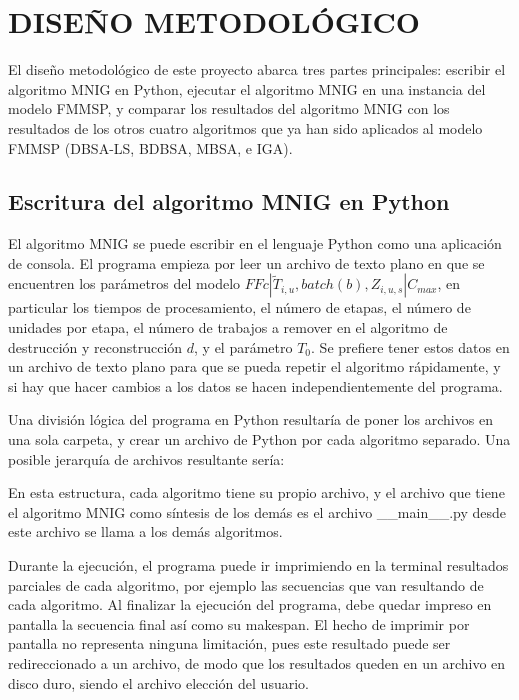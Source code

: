 \documentclass{article}
\def\notac_modelo{$FFc | \tilde{T}_{i, u}, batch(b), Z_{i, u, s} | C_{max}$}
\begin{document}
\section{DISEÑO METODOLÓGICO}

El diseño metodológico de este proyecto abarca tres partes principales: escribir el algoritmo MNIG en Python, ejecutar el algoritmo MNIG en una instancia del modelo FMMSP, y comparar los resultados del algoritmo MNIG con los resultados de los otros cuatro algoritmos que ya han sido aplicados al modelo FMMSP (DBSA-LS, BDBSA, MBSA, e IGA).

\subsection{Escritura del algoritmo MNIG en Python}

El algoritmo MNIG se puede escribir en el lenguaje Python como una aplicación de consola. El programa empieza por leer un archivo de texto plano en que se encuentren los parámetros del modelo \notac_modelo, en particular los tiempos de procesamiento, el número de etapas, el número de unidades por etapa, el número de trabajos a remover en el algoritmo de destrucción y reconstrucción $d$, y el parámetro $T_{0}$. Se prefiere tener estos datos en un archivo de texto plano para que se pueda repetir el algoritmo rápidamente, y si hay que hacer cambios a los datos se hacen independientemente del programa.

\vspace{\baselineskip}
Una división lógica del programa en Python resultaría de poner los archivos en una sola carpeta, y crear un archivo de Python por cada algoritmo separado. Una posible jerarquía de archivos resultante sería:

\vspace{\baselineskip}

\vspace{\baselineskip}
En esta estructura, cada algoritmo tiene su propio archivo, y el archivo que tiene el algoritmo MNIG como síntesis de los demás es el archivo \_\_main\_\_.py desde este archivo se llama a los demás algoritmos.

\vspace{\baselineskip}
Durante la ejecución, el programa puede ir imprimiendo en la terminal resultados parciales de cada algoritmo, por ejemplo las secuencias que van resultando de cada algoritmo. Al finalizar la ejecución del programa, debe quedar impreso en pantalla la secuencia final así como su makespan. El hecho de imprimir por pantalla no representa ninguna limitación, pues este resultado puede ser redireccionado a un archivo, de modo que los resultados queden en un archivo en disco duro, siendo el archivo elección del usuario.
\end{document}
